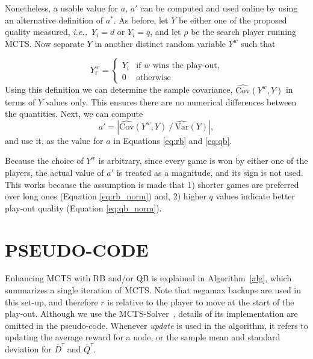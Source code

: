 \documentclass{ecai2014}
\newcommand{\ie}{{\it i.e.,}~}
\newcommand{\SVar}[1]{\mathrm{\widehat{Var}}\left( #1 \right)}
\newcommand{\SCov}[1]{\mathrm{\widehat{Cov}}\left( #1 \right)}
\begin{document}
Nonetheless, a usable value for $a$, $a'$ can be computed and used online by using an alternative definition of $a^*$. As before, let $Y$ be either one of the proposed quality measured, \ie $Y_i=d$ or $Y_i=q$, and let $\rho$ be the search player running MCTS. Now separate $Y$ in another distinct random variable $Y^w$ such that

\begin{equation}
Y^w_i =
\begin{cases}
   Y_i & \text{if $w$ wins the play-out,} \\
   0   & \text{otherwise}
\end{cases}
\label{eq:ywin}
\end{equation}
Using this definition we can determine the sample covariance, $\SCov{Y^w,Y}$ in terms of $Y$ values only. This ensures there are no numerical differences between the quantities. Next, we can compute 
\begin{equation}
	a'=\left|{\SCov{Y^w,Y}}\mathbin{/}{\SVar{Y}}\right|,
\label{eq:onlinea}
\end{equation}
\noindent and use it, as the value for $a$ in Equations \ref{eq:rb} and \ref{eq:qb}. 

Because the choice of $Y^w$ is arbitrary, since every game is won by either one of the players, the actual value of $a'$ is treated as a magnitude, and its sign is not used. This works because the assumption is made that 1) shorter games are preferred over long ones (Equation \ref{eq:rb_norm}) and, 2) higher $q$ values indicate better play-out quality (Equation \ref{eq:qb_norm}).

\section{PSEUDO-CODE}
\label{sec:pseudo-code}

Enhancing MCTS with RB and/or QB is explained in Algorithm~\ref{alg}, which summarizes a single iteration of MCTS. Note that negamax backups are used in this set-up, and therefore $r$ is relative to the player to move at the start of the play-out. Although we use the MCTS-Solver~\cite{Winands2010b}, details of its implementation are omitted in the pseudo-code. Whenever \emph{update} is used in the algorithm, it refers to updating the average reward for a node, or the sample mean and standard deviation for $\bar{D}^\tau$ and $\bar{Q}^\tau$.
\end{document}
